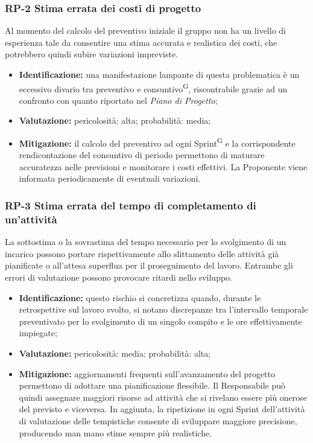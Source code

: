 \documentclass[8pt]{article}
\newcommand{\glossterm}[1]{#1\textsuperscript{G}} %
\begin{document}
\subsubsection{RP-2 Stima errata dei costi di progetto}
Al momento del calcolo del preventivo iniziale il gruppo non ha un livello di esperienza tale da consentire una stima accurata e realistica dei costi, che potrebbero quindi subire variazioni impreviste.
\begin{itemize}
\setlength\itemsep{0em}
    \item \textbf{Identificazione:} una manifestazione lampante di questa problematica è un eccessivo divario tra preventivo e \glossterm{consuntivo}, riscontrabile grazie ad un confronto con quanto riportato nel \textit{Piano di Progetto};
    \item \textbf{Valutazione:} pericolosità: alta; probabilità: media;
    \item \textbf{Mitigazione:} il calcolo del preventivo ad ogni \glossterm{Sprint} e la corrispondente rendicontazione del consuntivo di periodo permettono di maturare accuratezza nelle previsioni e monitorare i costi effettivi. La Proponente viene informata periodicamente di eventuali variazioni.
\end{itemize}
\subsubsection{RP-3 Stima errata del tempo di completamento di un'attività}
La sottostima o la sovrastima del tempo necessario per lo svolgimento di un incarico possono portare rispettivamente allo slittamento delle attività già pianificate o all'attesa superflua per il proseguimento del lavoro. Entrambe gli errori di valutazione possono provocare ritardi nello sviluppo.
\begin{itemize}
\setlength\itemsep{0em}
    \item \textbf{Identificazione:} questo rischio si concretizza quando, durante le retrospettive sul lavoro svolto, si notano discrepanze tra l'intervallo temporale preventivato per lo svolgimento di un singolo compito e le ore effettivamente impiegate;
    \item \textbf{Valutazione:} pericolosità: media; probabilità: alta;
    \item \textbf{Mitigazione:} aggiornamenti frequenti sull'avanzamento del progetto permettono di adottare una pianificazione flessibile. Il Responsabile può quindi assegnare maggiori risorse ad attività che si rivelano essere più onerose del previsto e viceversa. In aggiunta, la ripetizione in ogni Sprint dell'attività di valutazione delle tempistiche consente di sviluppare maggiore precisione, producendo man mano stime sempre più realistiche.
\end{itemize}
\end{document}
